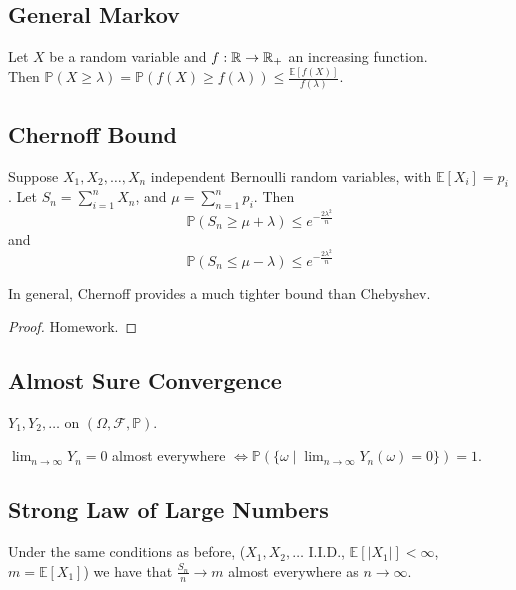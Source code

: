 \documentclass[english, course]{Notes}
\begin{document}
\subsection{General Markov}

\begin{theorem}
Let $X$ be a random variable and $f: \mathbb{R} \to \mathbb{R}_+$ an increasing function.\\

Then $\mathbb{P}(X \geq \lambda) = \mathbb{P}(f(X) \geq f(\lambda)) \leq \frac{\mathbb{E}[f(X)]}{f(\lambda)}$.\\
\end{theorem}

\subsection{Chernoff Bound}

\begin{theorem}
Suppose $X_1, X_2, \dots, X_n$ independent Bernoulli random variables, with $\mathbb{E}[X_i] = p_i$. Let $S_n = \sum_{i = 1}^n X_n$, and $\mu = \sum_{n = 1}^n p_i$. Then
\[\mathbb{P}(S_n \geq \mu + \lambda) \leq e^{-\frac{2\lambda^2}{n}}\]
and\[
\mathbb{P}(S_n \leq \mu - \lambda) \leq e^{-\frac{2\lambda^2}{n}}\]

In general, Chernoff provides a much tighter bound than Chebyshev.\\
\end{theorem}

\begin{proof}
Homework.
\end{proof}

\subsection{Almost Sure Convergence}
$Y_1, Y_2, \dots$ on $(\Omega, \mathcal{F}, \mathbb{P})$.\\

\begin{definition}
$\lim_{n \to \infty} Y_n = 0$ almost everywhere $\iff \mathbb{P}(\{\omega \mid \lim_{n \to \infty} Y_n(\omega) = 0 \}) = 1$.
\end{definition}

\subsection{Strong Law of Large Numbers}

\begin{theorem}
Under the same conditions as before, ($X_1, X_2, \dots$ I.I.D., $\mathbb{E}[|X_1|] < \infty$, $m = \mathbb{E}[X_1]$) we have that $\frac{S_n}{n} \to m$ almost everywhere as $n \to \infty$.
\end{theorem}
\end{document}
